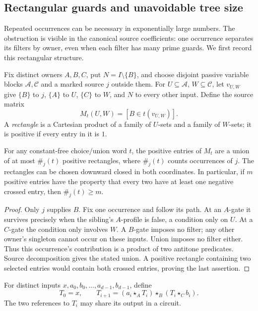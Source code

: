 \subsection{Rectangular guards and unavoidable tree size}
\label{app:core-rectangles}

Repeated occurrences can be necessary in exponentially large numbers.
The obstruction is visible in the canonical source coefficients: one
occurrence separates its filters by owner, even when each filter has
many prime guards. We first record this rectangular structure.

Fix distinct owners $A,B,C$, put $N=I\setminus\{B\}$, and choose
disjoint passive variable blocks $\mathcal A,\mathcal C$ and a marked
source $j$ outside them. For $U\subseteq\mathcal A$, $W\subseteq\mathcal C$,
let $v_{U,W}$ give $\{B\}$ to $j$, $\{A\}$ to $U$, $\{C\}$ to $W$,
and $N$ to every other input. Define the source matrix
\[
 M_t(U,W)=[B\in t(v_{U,W})].
\]
A \emph{rectangle} is a Cartesian product of a family of $U$-sets
and a family of $W$-sets; it is positive if every entry in it is $1$.

\begin{lemma}\label{core:lem:source-rectangles}
For any constant-free choice/union word $t$, the positive entries of
$M_t$ are a union of at most $\#_j(t)$ positive rectangles, where
$\#_j(t)$ counts occurrences of $j$. The rectangles can be chosen
downward closed in both coordinates. In particular, if $m$ positive
entries have the property that every two have at least one negative
crossed entry, then $\#_j(t)\geq m$.
\end{lemma}
\begin{proof}
Only $j$ supplies $B$. Fix one occurrence and follow its path.
At an $A$-gate it survives precisely when the sibling's $A$-profile
is false, a condition only on $U$. At a $C$-gate the condition only
involves $W$. A $B$-gate imposes no filter; any other owner's singleton
cannot occur on these inputs. Union imposes no filter either.
Thus this occurrence's contribution is a product of two antitone
predicates. Source decomposition gives the stated union. A positive
rectangle containing two selected entries would contain both crossed
entries, proving the last assertion.
\end{proof}

For distinct inputs $x,a_0,b_0,\ldots,a_{d-1},b_{d-1}$, define
\begin{equation}\label{core:eq:iterated-mixed-circuit}
 T_0=x,\qquad
 T_{i+1}=(a_i\star_A T_i)\star_B(T_i\star_C b_i).
\end{equation}
The two references to $T_i$ may share its output in a circuit.

